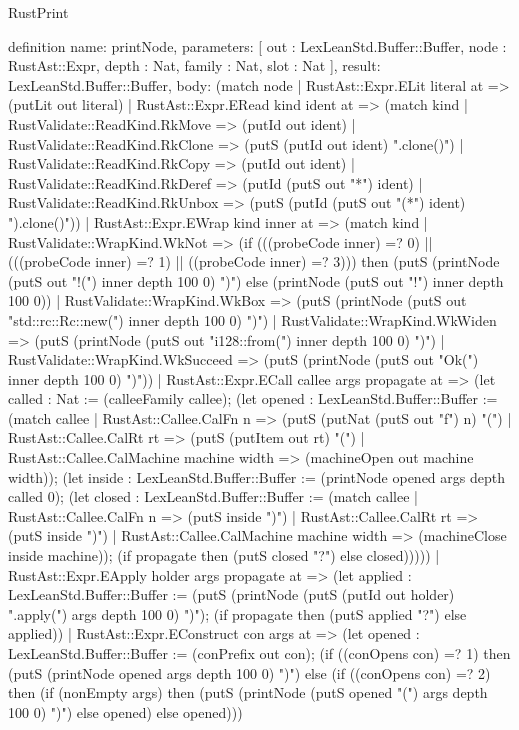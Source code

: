 \begin{lexlean}{RustPrint}
\begin{semanticmodule}
definition{
  name: printNode,
  parameters: [
    out : LexLeanStd.Buffer::Buffer,
    node : RustAst::Expr,
    depth : Nat,
    family : Nat,
    slot : Nat
  ],
  result: LexLeanStd.Buffer::Buffer,
  body: (match node
    | RustAst::Expr.ELit literal at => (putLit out literal)
    | RustAst::Expr.ERead kind ident at => (match kind
      | RustValidate::ReadKind.RkMove => (putId out ident)
      | RustValidate::ReadKind.RkClone => (putS (putId out ident) ".clone()")
      | RustValidate::ReadKind.RkCopy => (putId out ident)
      | RustValidate::ReadKind.RkDeref => (putId (putS out "*") ident)
      | RustValidate::ReadKind.RkUnbox => (putS (putId (putS out "(*") ident) ").clone()"))
    | RustAst::Expr.EWrap kind inner at => (match kind
      | RustValidate::WrapKind.WkNot => (if (((probeCode inner) =? 0) || (((probeCode inner) =? 1) || ((probeCode inner) =? 3))) then (putS (printNode (putS out "!(") inner depth 100 0) ")") else (printNode (putS out "!") inner depth 100 0))
      | RustValidate::WrapKind.WkBox => (putS (printNode (putS out "std::rc::Rc::new(") inner depth 100 0) ")")
      | RustValidate::WrapKind.WkWiden => (putS (printNode (putS out "i128::from(") inner depth 100 0) ")")
      | RustValidate::WrapKind.WkSucceed => (putS (printNode (putS out "Ok(") inner depth 100 0) ")"))
    | RustAst::Expr.ECall callee args propagate at => (let called : Nat := (calleeFamily callee); (let opened : LexLeanStd.Buffer::Buffer := (match callee
      | RustAst::Callee.CalFn n => (putS (putNat (putS out "f") n) "(")
      | RustAst::Callee.CalRt rt => (putS (putItem out rt) "(")
      | RustAst::Callee.CalMachine machine width => (machineOpen out machine width)); (let inside : LexLeanStd.Buffer::Buffer := (printNode opened args depth called 0); (let closed : LexLeanStd.Buffer::Buffer := (match callee
      | RustAst::Callee.CalFn n => (putS inside ")")
      | RustAst::Callee.CalRt rt => (putS inside ")")
      | RustAst::Callee.CalMachine machine width => (machineClose inside machine)); (if propagate then (putS closed "?") else closed)))))
    | RustAst::Expr.EApply holder args propagate at => (let applied : LexLeanStd.Buffer::Buffer := (putS (printNode (putS (putId out holder) ".apply(") args depth 100 0) ")"); (if propagate then (putS applied "?") else applied))
    | RustAst::Expr.EConstruct con args at => (let opened : LexLeanStd.Buffer::Buffer := (conPrefix out con); (if ((conOpens con) =? 1) then (putS (printNode opened args depth 100 0) ")") else (if ((conOpens con) =? 2) then (if (nonEmpty args) then (putS (printNode (putS opened "(") args depth 100 0) ")") else opened) else opened)))
}
\end{semanticmodule}
\end{lexlean}
